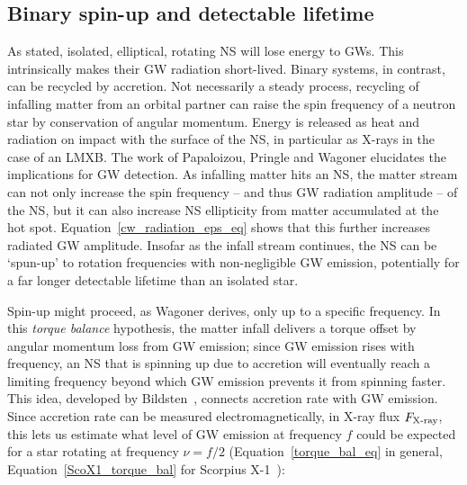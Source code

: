 

            \subsection{Binary spin-up and detectable lifetime}
            \label{spin-up}
         
As stated, isolated, elliptical, rotating NS will lose energy to GWs.
This intrinsically makes their GW radiation short-lived.
Binary systems, in contrast, can be recycled by accretion.
Not necessarily a steady process, recycling of infalling matter from an orbital partner can raise the spin frequency of a neutron star by conservation of angular momentum.
Energy is released as heat and radiation on impact with the surface of the NS, in particular as X-rays in the case of an LMXB.
The work of Papaloizou, Pringle and Wagoner elucidates the implications for GW detection.
As infalling matter hits an NS, the matter stream can not only increase the spin frequency -- and thus GW radiation amplitude -- of the NS, but it can also increase NS ellipticity from matter accumulated at the hot spot.
Equation~\ref{cw_radiation_eps_eq} shows that this further increases radiated GW amplitude.
Insofar as the infall stream continues, the NS can be `spun-up' to rotation frequencies with non-negligible GW emission, potentially for a far longer detectable lifetime than an isolated star.

Spin-up might proceed, as Wagoner derives, only up to a specific frequency.
In this \textit{torque balance} hypothesis, the matter infall delivers a torque offset by angular momentum loss from GW emission; since GW emission rises with frequency, an NS that is spinning up due to accretion will eventually reach a limiting frequency beyond which GW emission prevents it from spinning faster.
This idea, developed by Bildsten~\cite{Bildsten1998}, connects accretion rate with GW emission.
Since accretion rate can be measured electromagnetically, in X-ray flux $F_\textup{X-ray}$, this lets us estimate what level of GW emission at frequency $f$ could be expected for a star rotating at frequency $\nu = f/2$ (Equation~\ref{torque_bal_eq} in general, Equation~\ref{ScoX1_torque_bal} for Scorpius X-1~\cite{GoetzThesis,Bildsten1998}): 

